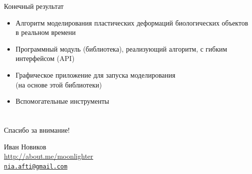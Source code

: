 \documentclass[usenames,dvipsnames,pdftex,unicode,hidelinks]{beamer}
\begin{document}
  \begin{frame}{Конечный результат}
    \begin{itemize}
      \setlength{\itemsep}{5mm}
      \item Алгоритм моделирования пластических деформаций биологических объектов в
        реальном времени
      \item Программный модуль (библиотека), реализующий алгоритм, с гибким интерфейсом (API)
      \item Графическое приложение для запуска моделирования \\(на основе этой библиотеки)
      \item Вспомогательные инструменты
    \end{itemize}
  \end{frame}


  \section{}

  \begin{frame}[plain]
    \begin{center}
      { \Huge Спасибо за внимание! }

      \vspace{1cm}

      Иван Новиков\\
      \url{http://about.me/moonlighter}\\
      \href{mailto:nia.afti@gmail.com}{\nolinkurl{nia.afti@gmail.com} }

    \end{center}
  \end{frame}

\end{document}
